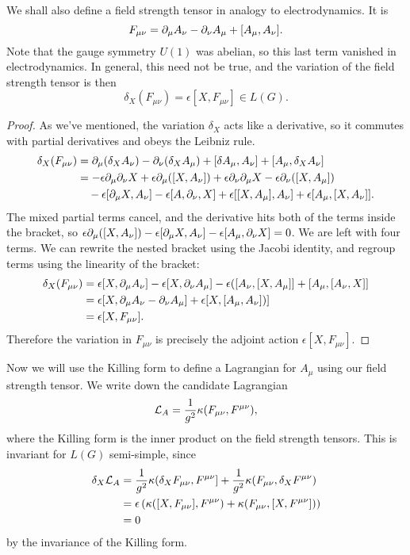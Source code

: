 We shall also define a field strength tensor in analogy to electrodynamics. It is
$$F_{\mu\nu}=\partial_\mu A_\nu -\partial_\nu A_\mu +[A_\mu, A_\nu].$$
Note that the gauge symmetry $U(1)$ was abelian, so this last term vanished in electrodynamics. In general, this need not be true, and the variation of the field strength tensor is then
$$\delta_X(F_{\mu\nu})=\epsilon [X,F_{\mu\nu}] \in L(G).$$
\begin{proof}
As we've mentioned, the variation $\delta_X$ acts like a derivative, so it commutes with partial derivatives and obeys the Leibniz rule.
\begin{align*}
    \delta_X(F_{\mu\nu}) &= \partial_\mu (\delta_X A_\nu)-\partial_\nu(\delta_X A_\mu) +[\delta A_\mu,A_\nu]+[A_\mu,\delta_X A_\nu]\\
    &=-\epsilon \partial_\mu \partial_\nu X+\epsilon \partial_\mu([X,A_\nu]) +\epsilon \partial_\nu \partial_\mu X - \epsilon \partial_\nu([X,A_\mu])\\
    &\quad {}-\epsilon[\partial_\mu X, A_\nu] - \epsilon [A,\partial_\nu, X] + \epsilon [[X,A_\mu],A_\nu]+\epsilon[A_\mu,[X,A_\nu]].
\end{align*}
The mixed partial terms cancel, and the derivative hits both of the terms inside the bracket, so $\epsilon \partial_\mu ([X,A_\nu])-\epsilon[\partial_\mu X,A_\nu]-\epsilon [A_\mu,\partial_\nu X]=0$. We are left with four terms. We can rewrite the nested bracket using the Jacobi identity, and regroup terms using the linearity of the bracket:
\begin{align*}
    \delta_X(F_{\mu\nu})&= \epsilon [X,\partial_\mu A_\nu]-\epsilon [X,\partial_\nu A_\mu] - \epsilon ([A_\nu,[X,A_\mu]]+[A_\mu,[A_\nu,X]]\\
    &=\epsilon [X,\partial_\mu A_\nu-\partial_\nu A_\mu]+\epsilon [X,[A_\mu,A_\nu])]\\
    &=\epsilon [X,F_{\mu\nu}].
\end{align*}
Therefore the variation in $F_{\mu\nu}$ is precisely the adjoint action $\epsilon [X,F_{\mu\nu}]$.
\end{proof}
Now we will use the Killing form to define a Lagrangian for $A_\mu$ using our field strength tensor. We write down the candidate Lagrangian
$$\mathcal L_A=\frac{1}{g^2} \kappa(F_{\mu\nu},F^{\mu\nu}),$$
where the Killing form is the inner product on the field strength tensors. This is invariant for $L(G)$ semi-simple, since
\begin{align*}
    \delta_X \mathcal L_A &= \frac{1}{g^2} \kappa(\delta_X F_{\mu\nu},F^{\mu\nu}] + \frac{1}{g^2} \kappa(F_{\mu\nu},\delta_X F^{\mu\nu})\\
    &=\epsilon \left(\kappa([X,F_{\mu\nu}],F^{\mu\nu})+\kappa(F_{\mu\nu},[X,F^{\mu\nu}])\right)\\
    &=0
\end{align*}
by the invariance of the Killing form.

